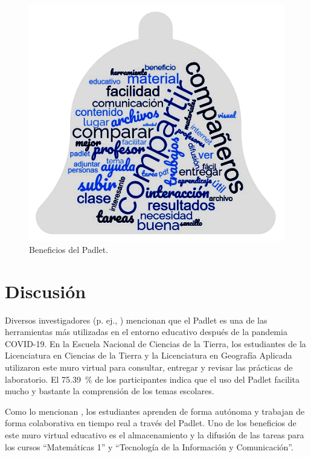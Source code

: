 \documentclass[spanish]{textolivre}
\begin{document}
\begin{figure}[h]
\centering
\begin{minipage}{.85\textwidth}
    \includegraphics[width=\linewidth]{Fig8.png}
    \caption{Beneficios del Padlet.}
    \label{fig8}
\end{minipage}
\end{figure}

\section{Discusión}\label{sec-links}
Diversos investigadores (p. ej., \cite{lomos2023,turner2023}) mencionan que el Padlet es una de las herramientas más utilizadas en el entorno educativo después de la pandemia COVID-19. En la Escuela Nacional de Ciencias de la Tierra, los estudiantes de la Licenciatura en Ciencias de la Tierra y la Licenciatura en Geografía Aplicada utilizaron este muro virtual para consultar, entregar y revisar las prácticas de laboratorio. El 75.39~\% de los participantes indica que el uso del Padlet facilita mucho y bastante la comprensión de los temas escolares.

Como lo mencionan \textcite{lee2023}, los estudiantes aprenden de forma autónoma y trabajan de forma colaborativa en tiempo real a través del Padlet. Uno de los beneficios de este muro virtual educativo es el almacenamiento y la difusión de las tareas para los cursos “Matemáticas 1” y “Tecnología de la Información y Comunicación”.
\end{document}
